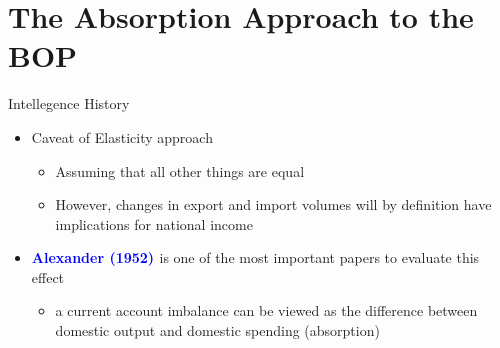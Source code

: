 \documentclass[10pt,hyperref={CJKbookmarks=true},xcolor=dvipsnames,aspectratio=169]{beamer}
\begin{document}
\section{The Absorption Approach to the BOP}
\begin{frame}{Intellegence History}

\begin{itemize}
\item Caveat of Elasticity approach

\begin{itemize}
\item Assuming that all other things are equal
\item However, changes in export and import volumes will by definition have
implications for national income
\end{itemize}
\item \textbf{\textcolor{blue}{Alexander (1952) }}is one of the most important
papers to evaluate this effect

\begin{itemize}
\item a current account imbalance can be viewed as the difference between
domestic output and domestic spending (absorption)
\end{itemize}
\end{itemize}
\end{frame}
\end{document}
